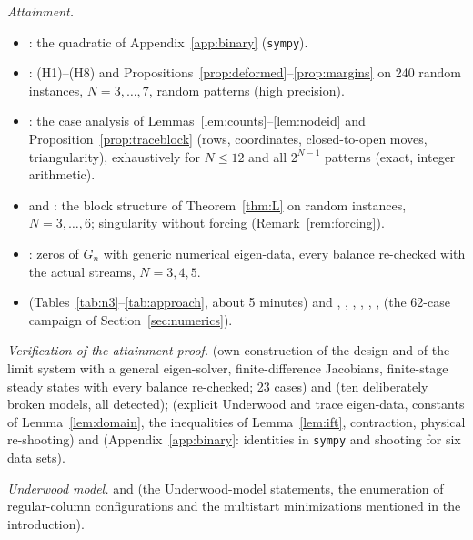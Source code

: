 \documentclass[11pt,a4paper]{report}
\begin{document}
\emph{Attainment.}
\begin{itemize}
\item {}: the quadratic of Appendix~\ref{app:binary} (\texttt{sympy}).
\item {}: (H1)--(H8) and Propositions~\ref{prop:deformed}--\ref{prop:margins} on 240
random instances, \(N=3,\dots,7\), random patterns (high precision).
\item {}: the case analysis of Lemmas~\ref{lem:counts}--\ref{lem:nodeid} and
Proposition~\ref{prop:traceblock} (rows, coordinates, closed-to-open moves, triangularity), exhaustively for \(N\le12\) and all
\(2^{N-1}\) patterns (exact, integer arithmetic).
\item {} and : the block structure of
Theorem~\ref{thm:L} on random instances, \(N=3,\dots,6\); singularity without forcing (Remark~\ref{rem:forcing}).
\item {}: zeros of \(G_n\) with generic numerical eigen-data, every balance
re-checked with the actual streams, \(N=3,4,5\).
\item {} (Tables~\ref{tab:n3}--\ref{tab:approach}, about 5 minutes) and
, , , , ,
,  (the 62-case campaign of Section~\ref{sec:numerics}).
\end{itemize}

\emph{Verification of the attainment proof.}  (own
construction of the design and of the limit system with a general eigen-solver, finite-difference Jacobians, finite-stage
steady states with every balance re-checked; 23 cases) and  (ten deliberately broken models,
all detected);  (explicit Underwood and trace eigen-data,
constants of Lemma~\ref{lem:domain}, the inequalities of Lemma~\ref{lem:ift}, contraction, physical re-shooting) and
 (Appendix~\ref{app:binary}: identities in \texttt{sympy} and shooting for six data sets).

\emph{Underwood model.}  and 
(the Underwood-model statements, the enumeration of regular-column configurations and the multistart minimizations
mentioned in the introduction).

\paperreferences
\end{document}
